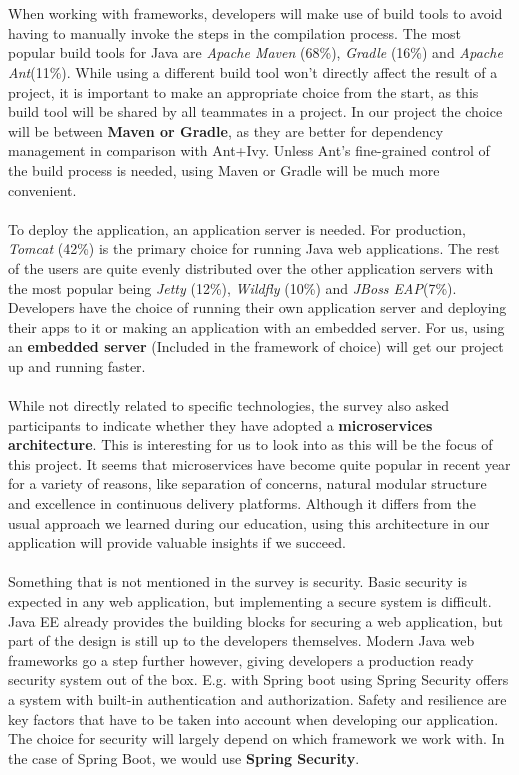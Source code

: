 \documentclass[12pt]{article}
\begin{document}
\begin{multicols}{2}
\\\\
When working with frameworks, developers will make use of build tools to avoid having to manually invoke the steps in the compilation process. The most popular build tools for Java are \textit{Apache Maven} (68\%), \textit{Gradle} (16\%) and \textit{Apache Ant}(11\%). While using a different build tool won't directly affect the result of a project, it is important to make an appropriate choice from the start, as this build tool will be shared by all teammates in a project. In our project the choice will be between \textbf{Maven or Gradle}, as they are better for dependency management in comparison with Ant+Ivy. Unless Ant's fine-grained control of the build process is needed, using Maven or Gradle will be much more convenient.
\\\\
To deploy the application, an application server is needed. For production, \textit{Tomcat} (42\%) is the primary choice for running Java web applications. The rest of the users are quite evenly distributed over the other application servers with the most popular being \textit{Jetty} (12\%), \textit{Wildfly} (10\%) and \textit{JBoss EAP}(7\%). Developers have the choice of running their own application server and deploying their apps to it or making an application with an embedded server. For us, using an \textbf{embedded server} (Included in the framework of choice) will get our project up and running faster.
\\\\
While not directly related to specific technologies, the survey also asked participants to indicate whether they have adopted a \textbf{microservices architecture}. This is interesting for us to look into as this will be the focus of this project. It seems that microservices have become quite popular in recent year for a variety of reasons, like separation of concerns, natural modular structure and excellence in continuous delivery platforms. \cite{WhyMicroservices48:online} Although it differs from the usual approach we learned during our education, using this architecture in our application will provide valuable insights if we succeed.  
\\\\
Something that is not mentioned in the survey is security. Basic security is expected in any web application, but implementing a secure system is difficult. Java EE already provides the building blocks for securing a web application, but part of the design is still up to the developers themselves.\cite{JavaEESecurity29:online} Modern Java web frameworks go a step further however, giving developers a production ready security system out of the box. E.g. with Spring boot using Spring Security offers a system with built-in authentication and authorization. Safety and resilience are key factors that have to be taken into account when developing our application. The choice for security will largely depend on which framework we work with. In the case of Spring Boot, we would use \textbf{Spring Security}. 

\end{multicols}
\end{document}
